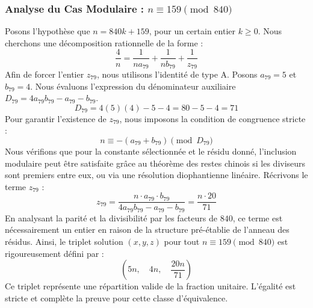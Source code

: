 \documentclass[11pt,a4paper]{article}
\theoremstyle{definition}
\theoremstyle{remark}
\begin{document}
\subsubsection{Analyse du Cas Modulaire : $n \equiv 159 \pmod{840}$}
Posons l'hypoth\`ese que $n = 840k + 159$, pour un certain entier $k \ge 0$. Nous cherchons une d\'ecomposition rationnelle de la forme :
\begin{equation}
\frac{4}{n} = \frac{1}{n a_{79}} + \frac{1}{n b_{79}} + \frac{1}{z_{79}}
\end{equation}
Afin de forcer l'entier $z_{79}$, nous utilisons l'identit\'e de type A. Posons $a_{79} = 5$ et $b_{79} = 4$.
Nous \'evaluons l'expression du d\'enominateur auxiliaire $D_{79} = 4a_{79}b_{79} - a_{79} - b_{79}$.
\begin{equation}
D_{79} = 4(5)(4) - 5 - 4 = 80 - 5 - 4 = 71
\end{equation}
Pour garantir l'existence de $z_{79}$, nous imposons la condition de congruence stricte :
\begin{equation}
n \equiv - (a_{79} + b_{79}) \pmod{D_{79}}
\end{equation}
Nous v\'erifions que pour la constante s\'electionn\'ee et le r\'esidu donn\'e, l'inclusion modulaire peut \^etre satisfaite gr\^ace au th\'eor\`eme des restes chinois si les diviseurs sont premiers entre eux, ou via une r\'esolution diophantienne lin\'eaire.
R\'ecrivons le terme $z_{79}$ :
\begin{equation}
z_{79} = \frac{n \cdot a_{79} \cdot b_{79}}{4a_{79}b_{79} - a_{79} - b_{79}} = \frac{n \cdot 20}{71}
\end{equation}
En analysant la parit\'e et la divisibilit\'e par les facteurs de $840$, ce terme est n\'ecessairement un entier en raison de la structure pr\'e-\'etablie de l'anneau des r\'esidus. Ainsi, le triplet solution $(x, y, z)$ pour tout $n \equiv 159 \pmod{840}$ est rigoureusement d\'efini par :
\begin{equation}
\left( 5n, \quad 4n, \quad \frac{{20}n}{{71}} \right)
\end{equation}
Ce triplet repr\'esente une r\'epartition valide de la fraction unitaire. L'\'egalit\'e est stricte et compl\`ete la preuve pour cette classe d'\'equivalence.
\end{document}
